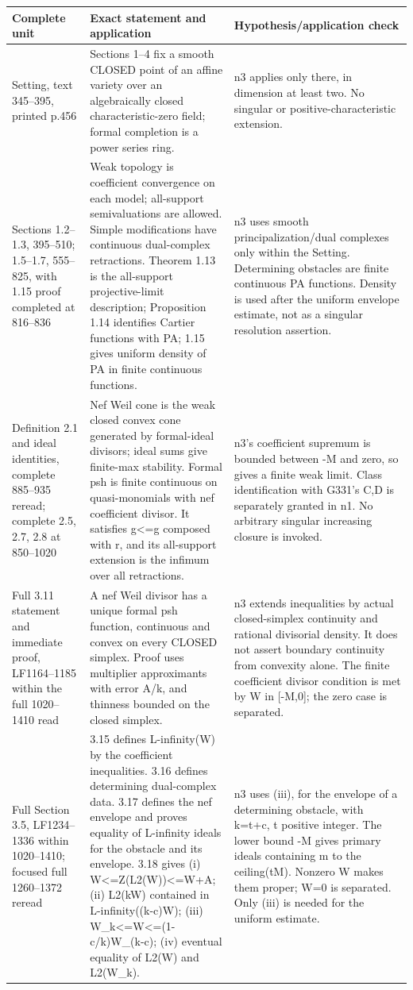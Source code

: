 \documentclass[11pt]{article}
\begin{document}
\small\begin{longtable}{p{4.47cm}p{4.47cm}p{4.47cm}}
Complete unit & Exact statement and application & Hypothesis/application check \\
\hline
Setting, text 345--395, printed p.456 & Sections 1--4 fix a smooth CLOSED point of an affine variety over an algebraically closed characteristic-zero field; formal completion is a power series ring. & n3 applies only there, in dimension at least two. No singular or positive-characteristic extension. \\
Sections 1.2--1.3, 395--510; 1.5--1.7, 555--825, with 1.15 proof completed at 816--836 & Weak topology is coefficient convergence on each model; all-support semivaluations are allowed. Simple modifications have continuous dual-complex retractions. Theorem 1.13 is the all-support projective-limit description; Proposition 1.14 identifies Cartier functions with PA; 1.15 gives uniform density of PA in finite continuous functions. & n3 uses smooth principalization/dual complexes only within the Setting. Determining obstacles are finite continuous PA functions. Density is used after the uniform envelope estimate, not as a singular resolution assertion. \\
Definition 2.1 and ideal identities, complete 885--935 reread; complete 2.5, 2.7, 2.8 at 850--1020 & Nef Weil cone is the weak closed convex cone generated by formal-ideal divisors; ideal sums give finite-max stability. Formal psh is finite continuous on quasi-monomials with nef coefficient divisor. It satisfies g<=g composed with r, and its all-support extension is the infimum over all retractions. & n3's coefficient supremum is bounded between -M and zero, so gives a finite weak limit. Class identification with G331's C,D is separately granted in n1. No arbitrary singular increasing closure is invoked. \\
Full 3.11 statement and immediate proof, LF1164--1185 within the full 1020--1410 read & A nef Weil divisor has a unique formal psh function, continuous and convex on every CLOSED simplex. Proof uses multiplier approximants with error A/k, and thinness bounded on the closed simplex. & n3 extends inequalities by actual closed-simplex continuity and rational divisorial density. It does not assert boundary continuity from convexity alone. The finite coefficient divisor condition is met by W in [-M,0]; the zero case is separated. \\
Full Section 3.5, LF1234--1336 within 1020--1410; focused full 1260--1372 reread & 3.15 defines L-infinity(W) by the coefficient inequalities. 3.16 defines determining dual-complex data. 3.17 defines the nef envelope and proves equality of L-infinity ideals for the obstacle and its envelope. 3.18 gives (i) W<=Z(L2(W))<=W+A; (ii) L2(kW) contained in L-infinity((k-c)W); (iii) W\_k<=W<=(1-c/k)W\_(k-c); (iv) eventual equality of L2(W) and L2(W\_k). & n3 uses (iii), for the envelope of a determining obstacle, with k=t+c, t positive integer. The lower bound -M gives primary ideals containing m to the ceiling(tM). Nonzero W makes them proper; W=0 is separated. Only (iii) is needed for the uniform estimate. \\

\end{longtable}
\end{document}
